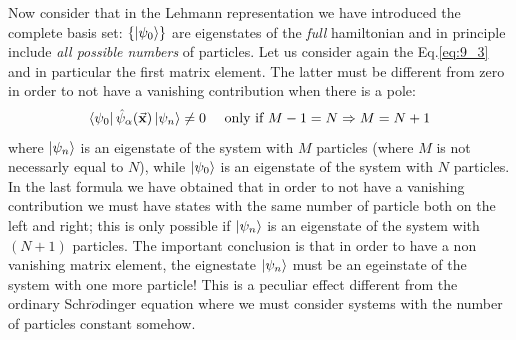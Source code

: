 \documentclass[../main/main.tex]{subfiles}
\begin{document}
Now consider that in the Lehmann representation we have introduced the complete basis set: \( \{ \ket{\psi _0}  \}   \) are eigenstates of the \emph{full} hamiltonian and in principle include \emph{all possible numbers} of particles.
Let us consider again the Eq.\eqref{eq:9_3} and in particular the first matrix element. The latter must be different from zero in order to not have a vanishing contribution when there is a pole:
\begin{equation*}
  \bra{\psi _0} \hat{\psi }_{\alpha } (\va{x}) \ket{\psi _n} \neq 0 \quad \text{ only if } M-1 = N  \Rightarrow M=N+1
\end{equation*}
where \( \ket{\psi _n} \) is an eigenstate of the system with \( M \) particles (where \( M \) is not necessarly equal to \( N \)), while \( \ket{\psi _0} \) is an eigenstate of the system with \( N \) particles. In the last formula we have obtained that in order to not have a vanishing contribution we must have states with the same number of particle both on the left and right; this is only possible if \( \ket{\psi _n}  \) is an eigenstate of the system with \( (N+1) \) particles.
The important conclusion is that in order to have a non vanishing matrix element, the eignestate \( \ket{\psi _n} \) must be an egeinstate of the system with one more particle! This is a peculiar effect different from the ordinary Schr$\ddot{o}$dinger equation where we must consider systems with the number of particles constant somehow.
\end{document}
